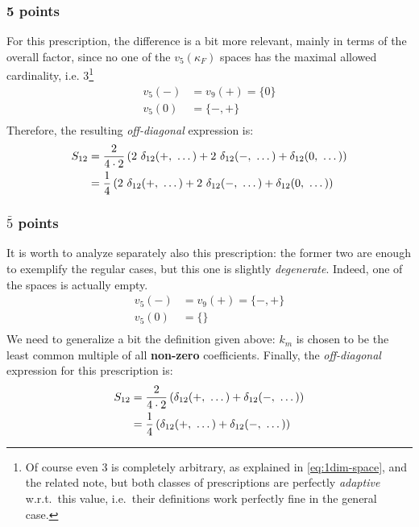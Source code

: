 \subsubsection{5 points}

For this prescription, the difference is a bit more relevant, mainly in terms
of the overall factor, since no one of the $v_5(\kappa_F)$ spaces has the
maximal allowed cardinality, i.e. $3$\footnote{
    Of course even 3 is completely arbitrary, as explained in
    \cref{eq:1dim-space}, and the related note, but both classes of
    prescriptions are perfectly \textit{adaptive} w.r.t.\ this value,
    i.e.\ their definitions work perfectly fine in the general case.
}
\begin{align}
    \label{eq:9specs-slices}
    v_5(-) &= v_9(+) = \{0\}\\
    v_5(0) &= \{-, +\}\\
\end{align}
Therefore, the resulting \textit{off-diagonal} expression is:
\begin{align}
    S_{12} &= \frac{2}{4 \cdot 2} \left(2\ \deltagroup{+} + 2\ \deltagroup{-} + \deltagroup{0}\right)\\
        &= \frac{1}{4} \left(2\ \deltagroup{+} + 2\ \deltagroup{-} + \deltagroup{0}\right)
\end{align}

\subsubsection{$\bar{5}$ points}

It is worth to analyze separately also this prescription: the former two are
enough to exemplify the regular cases, but this one is slightly
\textit{degenerate}.
Indeed, one of the spaces is actually empty.
\begin{align}
    \label{eq:5bar-specs-slices}
    v_5(-) &= v_9(+) = \{-, +\}\\
    v_5(0) &= \{\}\\
\end{align}
We need to generalize a bit the definition given above: $k_m$ is chosen to be
the least common multiple of all \textbf{non-zero} coefficients.
Finally, the \textit{off-diagonal} expression for this prescription is:
\begin{align}
    S_{12} &= \frac{2}{4 \cdot 2} \left(\delta_{12}(+,\ \dots) + \delta_{12}(-,\ \dots)\right)\\
        &= \frac{1}{4} \left(\delta_{12}(+,\ \dots) + \delta_{12}(-,\ \dots)\right)
\end{align}
